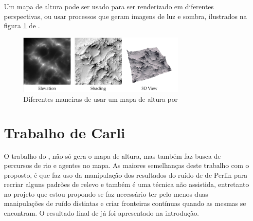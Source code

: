 Um mapa de altura pode ser usado para ser renderizado em diferentes perspectivas,
ou usar processos que geram imagens de luz e sombra, ilustrados na figura \ref{fig:hmap} de \cite{dachsbacher2006interactive}.
\begin{figure}[H]
    \centering
    \includegraphics[width=0.75\textwidth]{figuras/hmap.png}
    \caption{Diferentes maneiras de usar um mapa de altura por }
    \label{fig:hmap}
\end{figure}


\section{Trabalho de Carli}
O trabalho do \cite{carli2012canion}, não só gera o mapa de altura, mas também
faz busca de percursos de rio e agentes no mapa. As maiores semelhanças deste 
trabalho com o proposto, é que faz uso da manipulação dos resultados do ruído de
de Perlin para recriar alguns padrões de relevo e também é uma técnica não assistida,
entretanto no projeto que 
estou propondo se faz necessário ter pelo menos duas manipulações de ruído distintas
e criar fronteiras contínuas quando as mesmas se encontram. O resultado final de
\cite{carli2012canion} já foi apresentado na introdução.
